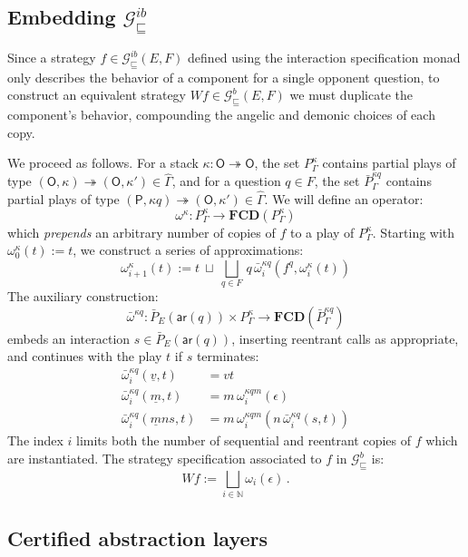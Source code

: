\documentclass[sigplan,screen]{acmart}
\newcommand{\gcat}{\mathcal{G}_{\sqsubseteq}}
\newcommand{\kw}[1]{\ensuremath{ \mathsf{#1} }}
\begin{document}
\subsection{Embedding $\gcat^{ib}$} %

Since a strategy $f \in \gcat^{ib}(E,F)$
defined using the interaction specification monad
only describes the behavior of a component
for a single opponent question,
to construct an equivalent strategy $W f \in \gcat^b(E,F)$
we must duplicate the component's behavior,
compounding the angelic and demonic choices of each copy.

We proceed as follows.
For a stack
$\kappa : \kw{O} \twoheadrightarrow \kw{O}$,
the set $P^\kappa_\Gamma$ contains
partial plays of type
$(\kw{O}, \kappa) \twoheadrightarrow (\kw{O}, \kappa')
 \in \hat{\Gamma}$,
and for a question $q \in F$,
the set $\bar{P}^{\kappa q}_\Gamma$ contains
partial plays of type
$(\kw{P}, \kappa q) \twoheadrightarrow (\kw{O}, \kappa')
 \in \hat{\Gamma}$.
We will define an operator:
\[
  \omega^\kappa :
    P^\kappa_\Gamma \rightarrow
    \mathbf{FCD}(P^\kappa_\Gamma)
\]
which \emph{prepends} an arbitrary number of copies of $f$
to a play of $P^\kappa_\Gamma$.
Starting with 
$\omega^\kappa_0(t) := t$,
we construct a series of approximations:
\[
  \omega^\kappa_{i+1}(t) :=
    t \: \sqcup \:
    \bigsqcup_{q \in F} \,
      q \, \bar{\omega}^{\kappa q}_i(f^q, \omega^\kappa_i(t))
\]
The auxiliary construction:
\[
  \bar{\omega}^{\kappa q} :
    \bar{P}_E(\kw{ar}(q)) \times P^{\kappa}_\Gamma \rightarrow
    \mathbf{FCD}(\bar{P}^{\kappa q}_\Gamma)
\]
embeds an interaction $s \in \bar{P}_E(\kw{ar}(q))$,
inserting reentrant calls as appropriate,
and continues with the play $t$
if $s$ terminates:
\begin{align*}
  \bar{\omega}^{\kappa q}_i(\underline v, t) &=
    v t
  \\
  \bar{\omega}^{\kappa q}_i(\underline m, t) &=
    m \, \omega^{\kappa q m}_i(\epsilon)
  \\
  \bar{\omega}^{\kappa q}_i(\underline m n s, t) &=
    m \, \omega^{\kappa q m}_i(n \, \bar{\omega}^{\kappa q}_i(s, t))
\end{align*}
The index $i$ limits both the number of
sequential and reentrant copies of $f$
which are instantiated.
The strategy specification associated to $f$
in $\gcat^{b}$ is:
\[
    W f := \bigsqcup_{i \in \mathbb{N}} \omega_i(\epsilon) \,.
\]


\subsection{Certified abstraction layers} %
\end{document}
